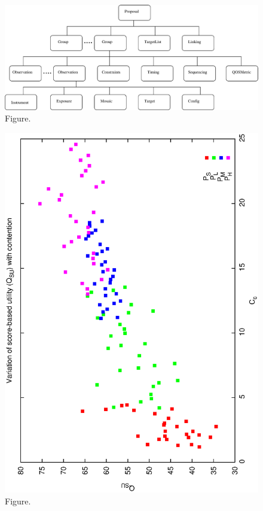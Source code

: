 \documentclass[12pt,a4paper]{article}
\begin{document}
\clearpage
\begin{figure}[htbp]
 \begin{center}
  \includegraphics[scale=1.0, angle=0]{figures/p2db.eps}
 \end{center}
  \caption[Figure.]
{Figure.}
\end{figure}
\clearpage
\begin{figure}[htbp]
 \begin{center}
  \includegraphics[scale=1.0, angle=0]{figures/p2_gen_qsu.eps}
 \end{center}
  \caption[Figure.]
{Figure.}
\end{figure}
\end{document}
